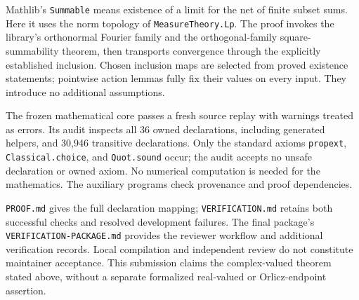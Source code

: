 \documentclass[11pt]{article}
\begin{document}
Mathlib's \texttt{Summable} means existence of a limit for the net of finite
subset sums. Here it uses the norm topology of \texttt{MeasureTheory.Lp}.
The proof invokes the library's orthonormal Fourier family and the
orthogonal-family square-summability theorem, then transports convergence
through the explicitly established inclusion. Chosen inclusion maps are
selected from proved existence statements; pointwise action lemmas fully
fix their values on every input. They introduce no additional assumptions.

The frozen mathematical core passes a fresh source replay with warnings
treated as errors. Its audit inspects all 36 owned declarations, including
generated helpers, and 30,946 transitive declarations. Only the standard
axioms \texttt{propext}, \texttt{Classical.choice}, and \texttt{Quot.sound}
occur; the audit accepts no unsafe declaration or owned axiom.
No numerical computation is needed for the mathematics. The auxiliary
programs check provenance and proof dependencies.

\texttt{PROOF.md} gives the full declaration mapping;
\texttt{VERIFICATION.md} retains both successful checks and resolved
development failures. The final package's \texttt{VERIFICATION-PACKAGE.md}
provides the reviewer workflow and additional verification records.
Local compilation and independent review do not constitute maintainer
acceptance. This submission claims the complex-valued theorem stated above,
without a separate formalized real-valued or Orlicz-endpoint assertion.
\end{document}
